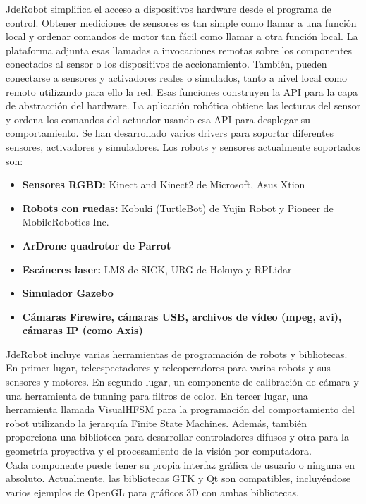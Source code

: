 \documentclass[a4paper, 12pt, oneside]{book}
\begin{document}
JdeRobot simplifica el acceso a dispositivos hardware desde el programa de control. Obtener mediciones de sensores es tan simple como llamar a una función local y ordenar comandos de motor tan fácil como llamar a otra función local. La plataforma adjunta esas llamadas a invocaciones remotas sobre los componentes conectados al sensor o los dispositivos de accionamiento. También, pueden conectarse a sensores y activadores reales o simulados, tanto a nivel local como remoto utilizando para ello la red. Esas funciones construyen la API para la capa de abstracción del hardware. La aplicación robótica obtiene las lecturas del sensor y ordena los comandos del actuador usando esa API para desplegar su comportamiento. Se han desarrollado varios drivers para soportar diferentes sensores, activadores y simuladores. Los robots y sensores actualmente soportados son:
\\
\begin{itemize}
\item \textbf{Sensores RGBD:} Kinect and Kinect2 de Microsoft, Asus Xtion
\item \textbf{Robots con ruedas:} Kobuki (TurtleBot) de Yujin Robot y Pioneer de MobileRobotics Inc.
\item \textbf{ArDrone quadrotor de Parrot}
\item \textbf{Escáneres laser:} LMS de SICK, URG de Hokuyo y RPLidar
\item \textbf{Simulador Gazebo}
\item \textbf{Cámaras Firewire, cámaras USB, archivos de vídeo (mpeg, avi), cámaras IP (como Axis)}
\end{itemize}

JdeRobot incluye varias herramientas de programación de robots y bibliotecas. En primer lugar, teleespectadores y teleoperadores para varios robots y sus sensores y motores. En segundo lugar, un componente de calibración de cámara y una herramienta de tunning para filtros de color. En tercer lugar, una herramienta llamada VisualHFSM para la programación del comportamiento del robot utilizando la jerarquía Finite State Machines. Además, también proporciona una biblioteca para desarrollar controladores difusos y otra para la geometría proyectiva y el procesamiento de la visión por computadora.
\\

Cada componente puede tener su propia interfaz gráfica de usuario o ninguna en absoluto. Actualmente, las bibliotecas GTK y Qt son compatibles, incluyéndose varios ejemplos de OpenGL para gráficos 3D con ambas bibliotecas.
\\
\end{document}
